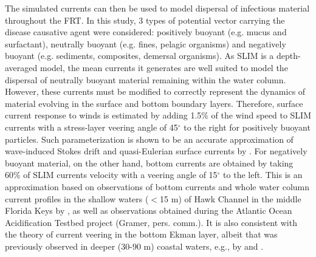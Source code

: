 \documentclass[utf8]{frontiersSCNS}
\begin{document}
The simulated currents can then be used to model dispersal of infectious material throughout the FRT. In this study, 3 types of potential vector carrying the disease causative agent were considered: positively buoyant (e.g. mucus and surfactant), neutrally buoyant (e.g. fines, pelagic organisms) and negatively buoyant (e.g. sediments, composites, demersal organisms). As SLIM is a depth-averaged model, the mean currents it generates are well suited to model the dispersal of neutrally buoyant material remaining within the water column. However, these currents must be modified to correctly represent the dynamics of material evolving in the surface and bottom boundary layers. Therefore, surface current response to winds is estimated by adding 1.5\% of the wind speed to SLIM currents with a stress-layer veering angle of 45$^\circ$ to the right for positively buoyant particles. Such parameterization is shown to be an accurate approximation of wave-induced Stokes drift and quasi-Eulerian surface currents by \cite{ardhuin2009observation}. For negatively buoyant material, on the other hand, bottom currents are obtained by taking 60\% of SLIM currents velocity with a veering angle of 15$^\circ$ to the left. This is an approximation based on observations of bottom currents and whole water column current profiles in the shallow waters ($<$15 m) of Hawk Channel in the middle Florida Keys by \cite{smith2009influence}, as well as observations obtained during the Atlantic Ocean Acidification Testbed project (Gramer, pers. comm.). It is also consistent with the theory of current veering in the bottom Ekman layer, albeit that was previously observed in deeper (30-90 m) coastal waters, e.g., by \cite{perlin2007organization} and \cite{kundu1976ekman}.
\end{document}
